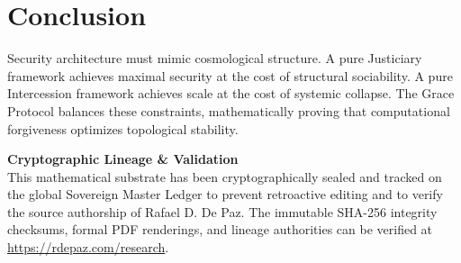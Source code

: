 \documentclass[12pt, a4paper]{article}
\begin{document}
\section{Conclusion}
Security architecture must mimic cosmological structure. A pure Justiciary framework achieves maximal security at the cost of structural sociability. A pure Intercession framework achieves scale at the cost of systemic collapse. The Grace Protocol balances these constraints, mathematically proving that computational forgiveness optimizes topological stability.


\vspace{2em}
\noindent\hrulefill
\vspace{1em}

\noindent\textbf{Cryptographic Lineage \& Validation}\\
This mathematical substrate has been cryptographically sealed and tracked on the global Sovereign Master Ledger to prevent retroactive editing and to verify the source authorship of Rafael D. De Paz. The immutable SHA-256 integrity checksums, formal PDF renderings, and lineage authorities can be verified at \url{https://rdepaz.com/research}.



\end{document}

